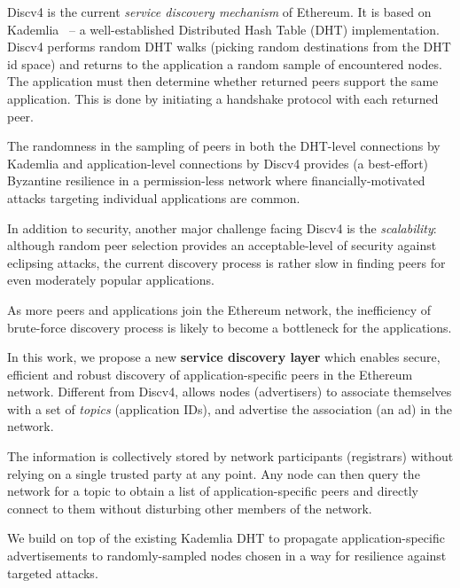  Discv4 is the current \textit{service discovery mechanism} of Ethereum. It is based on Kademlia~\cite{maymounkov2002kademlia} – a well-established Distributed Hash Table (DHT) implementation. Discv4 performs random DHT walks (picking random destinations from the DHT id space) and returns to the application a random sample of encountered nodes. The application must then determine whether returned peers support the same application. This is done by initiating a handshake protocol with each returned peer. 


The randomness in the sampling of peers in both the DHT-level connections by Kademlia and application-level connections by Discv4 provides (a best-effort) Byzantine resilience in a permission-less network where financially-motivated attacks targeting individual applications are common. 

In addition to security, another major challenge facing Discv4 is the \textit{scalability}: although random peer selection provides an acceptable-level of security against eclipsing attacks, the current discovery process is rather slow in finding peers for even moderately popular applications. 

As more peers and applications join the Ethereum network, the inefficiency of brute-force discovery process is likely to become a bottleneck for the applications. 

 In this work, we propose a new \textbf{service discovery layer} which enables secure,  efficient and robust  discovery of application-specific peers in the Ethereum network.
Different from Discv4, \sysname allows nodes (\ie advertisers) to associate themselves with a set of \emph{topics} (\eg application IDs), and advertise the association (\ie an ad) in the network. 

The information is collectively stored by network participants (\ie registrars) without relying on a single trusted party at any point. Any node can then query the network for a topic to obtain a list of application-specific peers and directly connect to them without disturbing other members of the network. 

We build \sysname on top of the existing Kademlia DHT to propagate application-specific advertisements to randomly-sampled nodes chosen in a way for resilience against targeted attacks. 

